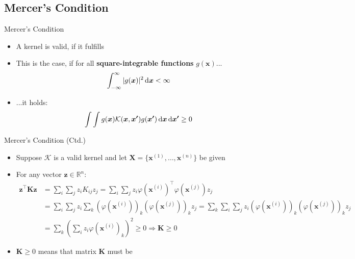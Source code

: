 \subsection{Mercer's Condition}

\begin{frame}{Mercer's Condition}{}
	\begin{itemize}
		\item A kernel is valid, if it fulfills 
		\item This is the case, if for all \textbf{square-integrable functions} $g(\bm{x})$...
		\begin{equation}
			\int_{-\infty}^{\infty} \vert g(\bm{x}) \vert^2 \mathop{}\!\mathrm{d} \bm{x} < \infty
		\end{equation}
		\item ...it holds:
		\begin{equation}
			\int \int g(\bm{x})\mathcal{K}(\bm{x}, \bm{x'})g(\bm{x'}) \mathop{}\!\mathrm{d} \bm{x} \mathop{}\!\mathrm{d} \bm{x'} \ge 0
		\end{equation}
	\end{itemize}
\end{frame}


\begin{frame}{Mercer's Condition (Ctd.)}{}\optional
	\begin{itemize}
		\item Suppose $\mathcal{K}$ is a valid kernel and let $\bm{X} = \{\bm{x}^{(1)}, \dots, \bm{x}^{(n)}\}$ be given
		\item For any vector $\bm{z} \in \mathbb{R}^n$:
		\vspace*{-1.5mm}
		\scriptsize
		\begin{align}
			\bm{z}^{\intercal} \bm{K} \bm{z}
				&= 	\sum_i \sum_j z_i K_{ij} z_j
						= \sum_i \sum_j z_i \varphi(\bm{x}^{(i)})^{\intercal} \varphi(\bm{x}^{(j)}) z_j 			\\
				&= \sum_i \sum_j z_i \sum_k (\varphi(\bm{x}^{(i)}))_k (\varphi(\bm{x}^{(j)}))_k z_j 
						= \sum_k \sum_i \sum_j z_i (\varphi(\bm{x}^{(i)}))_k (\varphi(\bm{x}^{(j)}))_k z_j 		\\
				&= \sum_k \left( \sum_i z_i \varphi(\bm{x}^{(i)})_k \right)^2 \ge 0 \Longrightarrow \bm{K} \ge 0
		\end{align}
		\normalsize
		\item $\bm{K} \ge 0$ means that matrix $\bm{K}$ must be 
	\end{itemize}
\end{frame}


